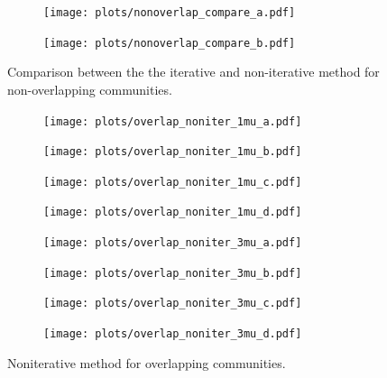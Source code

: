 \begin{figure}
    \centering
    \begin{subfigure}{0.5\textwidth}
    \texttt{[image: plots/nonoverlap\_compare\_a.pdf]}
    \end{subfigure}%
    \begin{subfigure}{0.5\textwidth}
    \texttt{[image: plots/nonoverlap\_compare\_b.pdf]}
    \end{subfigure}
    \caption{Comparison between the the iterative and non-iterative method for non-overlapping communities.}
\end{figure}


\begin{figure}
    \centering
    \begin{subfigure}{0.5\textwidth}
    \texttt{[image: plots/overlap\_noniter\_1mu\_a.pdf]}
    \end{subfigure}%
    \begin{subfigure}{0.5\textwidth}
    \texttt{[image: plots/overlap\_noniter\_1mu\_b.pdf]}
    \end{subfigure}
    \begin{subfigure}{0.5\textwidth}
    \texttt{[image: plots/overlap\_noniter\_1mu\_c.pdf]}
    \end{subfigure}%
    \begin{subfigure}{0.5\textwidth}
    \texttt{[image: plots/overlap\_noniter\_1mu\_d.pdf]}
    \end{subfigure}
    \begin{subfigure}{0.5\textwidth}
    \texttt{[image: plots/overlap\_noniter\_3mu\_a.pdf]}
    \end{subfigure}%
    \begin{subfigure}{0.5\textwidth}
    \texttt{[image: plots/overlap\_noniter\_3mu\_b.pdf]}
    \end{subfigure}
    \begin{subfigure}{0.5\textwidth}
    \texttt{[image: plots/overlap\_noniter\_3mu\_c.pdf]}
    \end{subfigure}%
    \begin{subfigure}{0.5\textwidth}
    \texttt{[image: plots/overlap\_noniter\_3mu\_d.pdf]}
    \end{subfigure}
    \caption{Noniterative method for overlapping communities.}
\end{figure}


